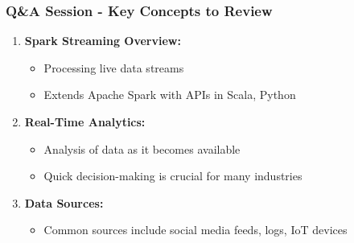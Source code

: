 \documentclass[aspectratio=169]{beamer}
\begin{document}
\begin{frame}[fragile]
    \frametitle{Q\&A Session - Key Concepts to Review}
    \begin{enumerate}
        \item \textbf{Spark Streaming Overview:}
        \begin{itemize}
            \item Processing live data streams
            \item Extends Apache Spark with APIs in Scala, Python
        \end{itemize}
        
        \item \textbf{Real-Time Analytics:}
        \begin{itemize}
            \item Analysis of data as it becomes available
            \item Quick decision-making is crucial for many industries
        \end{itemize}

        \item \textbf{Data Sources:}
        \begin{itemize}
            \item Common sources include social media feeds, logs, IoT devices
        \end{itemize}
    \end{enumerate}
\end{frame}
\end{document}

